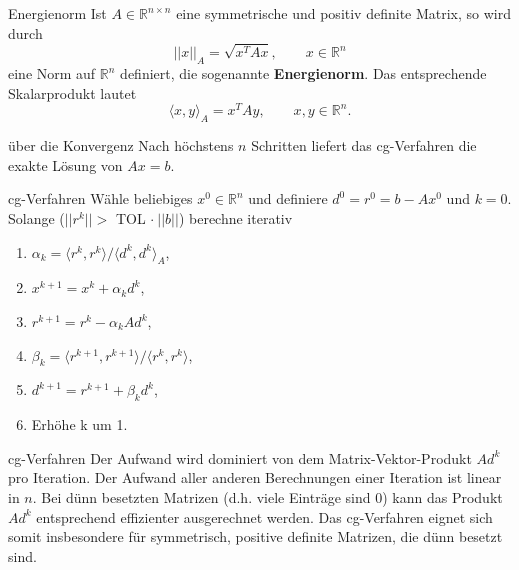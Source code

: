 
\begin{flashcard}[Definition]{Energienorm}
Ist $A \in \mathbb{R}^{n \times n}$ eine symmetrische und positiv definite Matrix, so wird durch
$$||x||_A = \sqrt{x^TAx}, \qquad x \in \mathbb{R}^n$$
eine Norm auf $\mathbb{R}^n$ definiert, die sogenannte \textbf{Energienorm}. Das entsprechende Skalarprodukt lautet
$$\langle x, y \rangle_A = x^TAy, \qquad x,y \in \mathbb{R}^n.$$
\end{flashcard}

\begin{flashcard}[Satz]{über die Konvergenz}
Nach höchstens $n$ Schritten liefert das cg-Verfahren die exakte Lösung von $Ax = b$.
\end{flashcard}

\begin{flashcard}[Algorithmus]{cg-Verfahren}
Wähle beliebiges $x^0 \in \mathbb{R}^n$ und definiere $d^0 = r^0 = b-Ax^0$ und $k=0$.\\
Solange ($||r^k|| >$ TOL $ \cdot \ ||b||$) berechne iterativ
\begin{enumerate}
	\item $\alpha_k = \langle r^k, r^k \rangle /  \langle d^k, d^k \rangle_A$,
	\item $x^{k+1} = x^k + \alpha_k d^k$,
	\item $r^{k+1} = r^k - \alpha_k Ad^k$,
	\item $\beta_k = \langle r^{k+1}, r^{k+1} \rangle / \langle r^k, r^k \rangle$,
	\item $d^{k+1} = r^{k+1} + \beta_k d^k$,
	\item Erhöhe k um 1.
\end{enumerate}
\end{flashcard}

\begin{flashcard}[Aufwand]{cg-Verfahren}
Der Aufwand wird dominiert von dem Matrix-Vektor-Produkt $Ad^k$ pro Iteration. Der Aufwand aller anderen Berechnungen einer Iteration ist linear in $n$. Bei dünn besetzten Matrizen (d.h. viele Einträge sind 0) kann das Produkt $Ad^k$ entsprechend effizienter ausgerechnet werden. Das cg-Verfahren eignet sich somit insbesondere für symmetrisch, positive definite Matrizen, die dünn besetzt sind.
\end{flashcard}